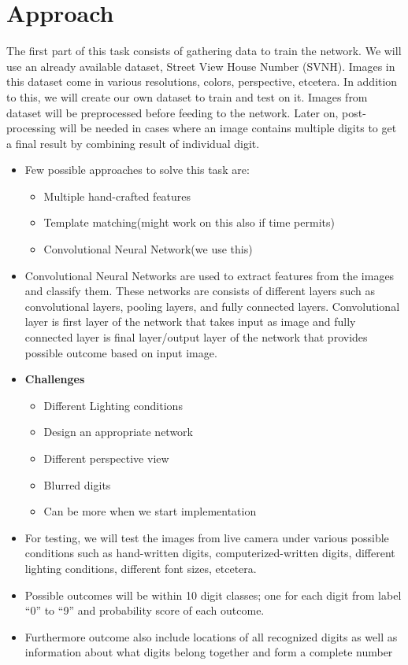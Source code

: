 \documentclass[12pt, letterpaper]{article}
\begin{document}
\section{Approach}
The first part of this task consists of gathering data to train the network. We will use an already available dataset, Street View House Number (SVNH)\cite{Reading Digits in Natural Images
	with Unsupervised Feature Learning}. Images in this dataset come in various resolutions, colors, perspective, etcetera. In addition to this, we will create our own dataset to train and test on it. 
Images from dataset will be preprocessed before feeding to the network. Later on, post-processing will be needed in cases where an image contains multiple digits to get a final result by combining result of individual digit. 
\begin{itemize}
	\item Few possible approaches to solve this task are:
		\begin{itemize}
			\item Multiple hand-crafted features
			\item Template matching(might work on this also if time permits)
			\item Convolutional Neural Network(we use this)
		\end{itemize}
	\item Convolutional Neural Networks are used to extract features
	from the images and classify them. These networks are consists of different layers such as convolutional layers, pooling layers, and fully connected layers. Convolutional layer is first layer of the network that takes input as image and fully connected layer is final layer/output layer of the network that provides possible outcome based on input image.
	\item  \textbf{Challenges}
		\begin{itemize}
			\item Different Lighting conditions
			\item Design an appropriate network
			\item Different perspective view
			\item Blurred digits 
			\item Can be more when we start implementation
			
		\end{itemize}
	\item For testing, we will test the images from live camera under various possible conditions such as hand-written digits, computerized-written digits, different lighting conditions, different font sizes, etcetera.
	\item Possible outcomes will be within 10 digit classes; one for each digit from label ``0'' to ``9'' and probability score of each outcome.
	\item Furthermore outcome also include locations of all recognized digits as well as information about what digits belong together and form a complete number
\end{itemize}
\end{document}
